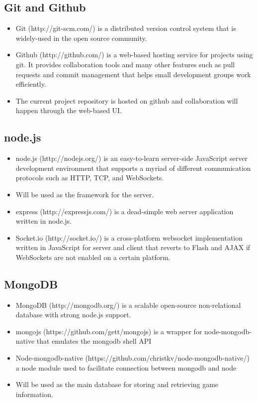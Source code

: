 \documentclass[letterpaper,12pt]{article}
\begin{document}
\subsection{Git and Github}
	\begin{itemize}
		\item Git (http://git-scm.com/) is a distributed version control system that is widely-used in the open source community.
		\item Github (http://github.com/) is a web-based hosting service for projects using git. It provides collaboration tools and many other features such as pull requests and commit management that helps small development groups work efficiently.
		\item The current project repository is hosted on github and collaboration will happen through the web-based UI.
	\end{itemize}
\subsection{node.js}
	\begin{itemize}
		\item node.js (http://nodejs.org/) is an easy-to-learn server-side JavaScript server development environment that supports a myriad of different communication protocols such as HTTP, TCP, and WebSockets.
		\item Will be used as the framework for the server.
		\item express (http://expressjs.com/) is a dead-simple web server application written in node.js.
		\item Socket.io (http://socket.io/) is a cross-platform websocket implementation written in JavaScript for server and client that reverts to Flash and AJAX if WebSockets are not enabled on a certain platform.
	\end{itemize}
\subsection{MongoDB}
	\begin{itemize}
		\item MongoDB (http://mongodb.org/) is a scalable open-source non-relational database with strong node.js support.
		\item mongojs (https://github.com/gett/mongojs) is a wrapper for node-mongodb-native that emulates the mongodb shell API
		\item Node-mongodb-native (https://github.com/christkv/node-mongodb-native/) a node module used to facilitate connection between mongodb and node
		\item Will be used as the main database for storing and retrieving game information.
	\end{itemize}
\end{document}

